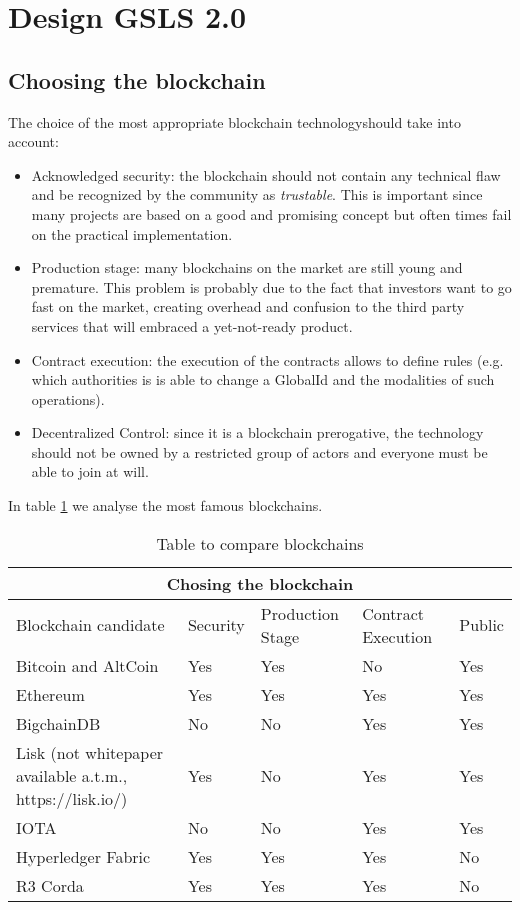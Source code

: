 
\section{Design GSLS 2.0}

\subsection{Choosing the blockchain}
The choice of the most appropriate blockchain technologyshould take into account:

\begin{itemize}
  \item Acknowledged security: the blockchain should not contain any technical flaw and be recognized by the community as \textit{trustable}. This is important since many projects are based on a good and promising concept but often times fail on the practical implementation.
  \item Production stage: many blockchains on the market are still young and premature. This problem is probably due to the fact that investors want to go fast on the market, creating overhead and confusion to the third party services that will embraced a yet-not-ready product.
  \item Contract execution: the execution of the contracts allows to define rules (e.g. which authorities is is able to change a GlobalId and the modalities of such operations).
  \item Decentralized Control: since it is a blockchain prerogative, the technology should not be owned by a restricted group of actors and everyone must be able to join at will.
\end{itemize}

In table \ref{table:1} we analyse the most famous blockchains.

\begin{table}[h!]
\centering
\begin{tabular}{ |p{7cm}|p{2cm}|p{2cm}|p{2cm}|p{2cm}|  }
\hline
\multicolumn{5}{|c|}{Chosing the blockchain} \\
\hline
Blockchain candidate & Security & Production Stage & Contract Execution & Public \\
\hline
Bitcoin and AltCoin \cite{Nakamoto_bitcoin:a} & Yes & Yes & No\cite{Bitcoin_notTuringComplete} & Yes \\
\hline
Ethereum \cite{etherum_whitepaper} & Yes & Yes & Yes & Yes \\
\hline
BigchainDB \cite{bigchaindb_whitepaper} & No \cite{_bigchaindb_bullshit} \ & No & Yes & Yes \\
\hline
Lisk (not whitepaper available a.t.m., https://lisk.io/)& Yes & No \cite{lisk_problems} & Yes & Yes \\
\hline
IOTA \cite{iota_whitepaper}& No \cite{iota_problems} & No & Yes & Yes \\
\hline
Hyperledger Fabric \cite{martindale_fabric:_2017}& Yes & Yes & Yes & No \\
\hline
R3 Corda \cite{corda_whitepaper}& Yes & Yes & Yes & No \\
\hline
\end{tabular}
\caption{Table to compare blockchains}
\label{table:1}
\end{table}

